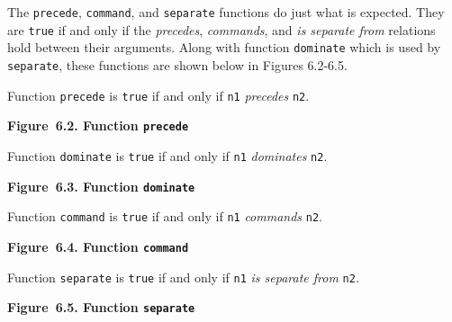 \documentclass{article}
\begin{document}
The \texttt{precede}, \texttt{command}, and \texttt{separate}
functions do just what is expected. They are \texttt{true} if
and only if the \textit{precedes}, \textit{commands}, and
\textit{is separate from} relations hold between their
arguments. Along with function \texttt{dominate} which is used
by \texttt{separate}, these functions are shown below in Figures
6.2-6.5.

Function \texttt{precede} is \texttt{true} if and only if
\texttt{n1} \textit{precedes} \texttt{n2}.

\bigbreak
\begin{minipage}{\textwidth}
\vbox{}
\bigbreak
{}
\textbf{Figure~6.2. Function \texttt{precede}}
\end{minipage}
\bigbreak

Function \texttt{dominate} is \texttt{true} if and only if
\texttt{n1} \textit{dominates} \texttt{n2}.

\bigbreak
\begin{minipage}{\textwidth}
\vbox{}
\bigbreak
{}
\textbf{Figure~6.3. Function \texttt{dominate}}
\end{minipage}
\bigbreak

Function \texttt{command} is \texttt{true} if and only if
\texttt{n1} \textit{commands} \texttt{n2}.

\bigbreak
\begin{minipage}{\textwidth}
\vbox{}
\bigbreak
{}
\textbf{Figure~6.4. Function \texttt{command}}
\end{minipage}
\bigbreak

Function \texttt{separate} is \texttt{true} if and only if
\texttt{n1} \textit{is separate from} \texttt{n2}.

\bigbreak
\begin{minipage}{\textwidth}
\vbox{}
\bigbreak
{}
\textbf{Figure~6.5. Function \texttt{separate}}
\end{minipage}
\bigbreak
\end{document}
